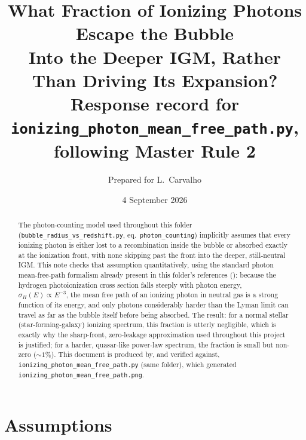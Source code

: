 \documentclass[11pt,a4paper]{article}
\title{\bf What Fraction of Ionizing Photons Escape the Bubble\\ Into the Deeper IGM, Rather Than Driving Its Expansion?\\[2mm]
\large Response record for \texttt{ionizing\_photon\_mean\_free\_path.py}, following Master Rule 2}
\author{Prepared for L.\ Carvalho}
\date{4 September 2026}
\begin{document}
\maketitle

\begin{abstract}
\noindent
The photon-counting model used throughout this folder (\texttt{bubble\_radius\_vs\_redshift.py}, eq.\
\texttt{photon\_counting}) implicitly assumes that every ionizing photon is either lost to a recombination
inside the bubble or absorbed exactly at the ionization front, with none skipping past the front into the
deeper, still-neutral IGM. This note checks that assumption quantitatively, using the standard photon
mean-free-path formalism already present in this folder's references
(\citealt{Choudhury2022,MiraldaEscude2000,Gnedin2022}): because the hydrogen photoionization cross section
falls steeply with photon energy, $\sigma_H(E)\propto E^{-3}$, the mean free path of an ionizing photon in
neutral gas is a strong function of its energy, and only photons considerably harder than the Lyman limit
can travel as far as the bubble itself before being absorbed. The result: for a normal stellar
(star-forming-galaxy) ionizing spectrum, this fraction is utterly negligible, which is exactly why the
sharp-front, zero-leakage approximation used throughout this project is justified; for a harder,
quasar-like power-law spectrum, the fraction is small but non-zero ($\sim1\%$). This document is produced
by, and verified against, \texttt{ionizing\_photon\_mean\_free\_path.py} (same folder), which generated
\texttt{ionizing\_photon\_mean\_free\_path.png}.
\end{abstract}

\tableofcontents

\section{Assumptions}
\label{sec:assumptions}
\end{document}
